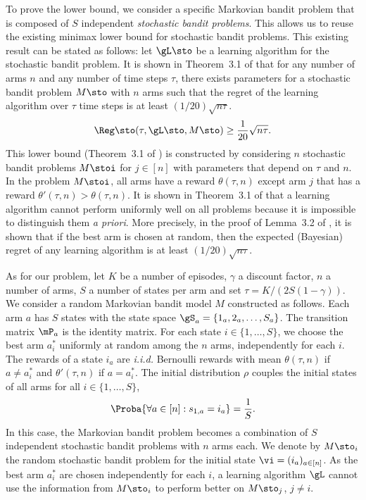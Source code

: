 \begin{subappendices}
To prove the lower bound, we consider a specific Markovian bandit problem that is composed of $S$ independent \emph{stochastic bandit problems}. 
This allows us to reuse the existing minimax lower bound for stochastic bandit problems. 
This existing result can be stated as follows: let $\gL\sto$ be a learning algorithm for the stochastic bandit problem. 
It is shown in Theorem~3.1 of \cite{bubeck2012regret} that for any number of arms $n$ and any number of time steps $\tau$, there exists parameters for a stochastic bandit problem $M\sto$ with $n$ arms such that the regret of the learning algorithm over $\tau$ time steps is at least $(1/20)\sqrt{n \tau}$. 
\begin{align}
    \label{eq:regret_sto}
    \Reg\sto( \tau, \gL\sto, M\sto) \ge \frac1{20}\sqrt{n\tau}. 
\end{align}
This lower bound (Theorem~3.1 of \cite{bubeck2012regret}) is constructed by considering $n$ stochastic bandit problems $M\stoi$ for $j\in[n]$ with parameters that depend on $\tau$ and $n$. 
In the problem $M\stoi$, all arms have a reward $\theta(\tau,n)$ except arm $j$ that has a reward $\theta'(\tau,n)>\theta(\tau,n)$. 
It is shown in Theorem~3.1 of \cite{bubeck2012regret} that a learning algorithm cannot perform uniformly well on all problems because it is impossible to distinguish them \emph{a priori}. 
More precisely, in the proof of Lemma~3.2 of \cite{bubeck2012regret}, it is shown that if the best arm is chosen at random, then the expected (Bayesian) regret of any learning algorithm is at least $(1/20)\sqrt{n \tau}$.

As for our problem, let $K$ be a number of episodes, $\gamma$ a discount factor, $n$ a number of arms, $S$ a number of states per arm and set $\tau=K/(2S(1-\gamma))$. 
We consider a random Markovian bandit model $M$ constructed as follows. 
Each arm $a$ has $S$ states with the state space $\gS_a = \{ 1_a,2_a,\ldots, S_a\}$. 
The transition matrix $\mP_a$ is the identity matrix. 
For each state $i\in\{1,\dots, S\}$, we choose the best arm $a^*_i$ uniformly at random among the $n$ arms, independently for each $i$. 
The rewards of a state $i_a$ are \emph{i.i.d.} Bernoulli rewards with mean $\theta(\tau,n)$ if $a\ne a^*_i$ and $\theta'(\tau,n)$ if $a=a^*_i$. 
The initial distribution $\rho$ couples the initial states of all arms for all $i\in\{1,\dots, S\}$, 
\begin{align*}
    \Proba{\forall a\in[n]: s_{1,a} = i_a} = \frac1S. 
\end{align*} 
In this case, the Markovian bandit problem becomes a combination of $S$ independent stochastic bandit problems with $n$ arms each. 
We denote by $M\sto_i$ the random stochastic bandit problem for the initial state $\vi=(i_a)_{a\in[n]}$. As the best arm $a^*_i$ are chosen independently for each $i$, a learning algorithm $\gL$ cannot use the information from $M\sto_i$ to perform better on $M\sto_j$, $j\ne i$.


\end{subappendices}
